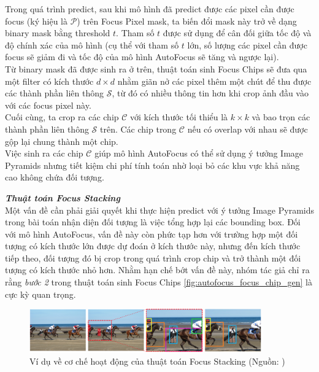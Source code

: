 {    \noindent
    Trong quá trình predict, sau khi mô hình đã predict được các pixel cần được focus (ký hiệu là $\mathcal{P}$) trên Focus Pixel mask, ta biến đổi mask này trở về dạng binary mask bằng threshold $t$.
    Tham số $t$ được sử dụng để cân đối giữa tốc độ và độ chính xác của mô hình (cụ thể với tham số $t$ lớn, số lượng các pixel cần được focus sẽ giảm đi và tốc độ của mô hình AutoFocus sẽ tăng và ngược lại). \\
    Từ binary mask đã được sinh ra ở trên, thuật toán sinh Focus Chips sẽ đưa qua một filter có kích thước $d \times d$ nhằm giãn nở các pixel thêm một chút để thu được các thành phần liên thông $\mathcal{S}$, từ đó có nhiều thông tin hơn khi crop ảnh đầu vào với các focus pixel này. \\
    Cuối cùng, ta crop ra các chip $\mathcal{C}$ với kích thước tối thiểu là $k \times k$ và bao trọn các thành phần liên thông $\mathcal{S}$ trên.
    Các chip trong $\mathcal{C}$ nếu có overlap với nhau sẽ được gộp lại chung thành một chip. \\
    Việc sinh ra các chip $\mathcal{C}$ giúp mô hình AutoFocus có thể sử dụng ý tưởng Image Pyramids nhưng tiết kiệm chi phí tính toán nhờ loại bỏ các khu vực khả năng cao không chứa đối tượng.

    \noindent
    \textbf{\textit{Thuật toán Focus Stacking}} \\
    Một vấn đề cần phải giải quyết khi thực hiện predict với ý tưởng Image Pyramids trong bài toán nhận diện đối tượng là việc tổng hợp lại các bounding box.
    Đối với mô hình AutoFocus, vấn đề này còn phức tạp hơn với trường hợp một đối tượng có kích thước lớn được dự đoán ở kích thước này, nhưng đến kích thước tiếp theo, đối tượng đó bị crop trong quá trình crop chip và trở thành một đối tượng có kích thước nhỏ hơn.
    Nhằm hạn chế bớt vấn đề này, nhóm tác giả chỉ ra rằng \textit{bước 2} trong thuật toán sinh Focus Chips \ref{fig:autofocus_focus_chip_gen} là cực kỳ quan trọng.

    \begin{figure}[H]
        \centering
        \includegraphics[width=10cm] {images/autofocus_focus_stack}
        \caption{Ví dụ về cơ chế hoạt động của thuật toán Focus Stacking (Nguồn: \cite{najibi2019autofocus})}
        \label{fig:autofocus_focus_stack}
    \end{figure}

}
